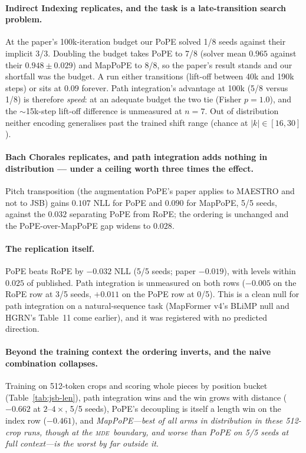 \documentclass[10pt]{article}
\newcommand{\mde}{\textsc{mde}}
\begin{document}
\paragraph{Indirect Indexing replicates, and the task is a late-transition search problem.} At the paper's
100k-iteration budget our PoPE solved 1/8 seeds against their implicit 3/3. Doubling the budget takes PoPE to
7/8 (solver mean $0.965$ against their $0.948\pm0.029$) and MapPoPE to 8/8, so the paper's result stands and
our shortfall was the budget. A run either transitions (lift-off between 40k and 190k steps) or sits at
$0.09$ forever. Path integration's advantage at 100k (5/8 versus 1/8) is therefore \emph{speed}: at an
adequate budget the two tie (Fisher $p=1.0$), and the $\sim$15k-step lift-off difference is unmeasured at
$n=7$. Out of distribution neither encoding generalises past the trained shift range (chance at
$|k|\in[16,30]$). %

\paragraph{Bach Chorales replicates, and path integration adds nothing in distribution --- under a
ceiling worth three times the effect.} Pitch transposition (the augmentation PoPE's paper applies to
MAESTRO and not to JSB) gains $0.107$ NLL for PoPE and $0.090$ for MapPoPE, 5/5 seeds, against the
$0.032$ separating PoPE from RoPE; the ordering is unchanged and the PoPE-over-MapPoPE gap widens to
$0.028$. %

\paragraph{The replication itself.} PoPE beats RoPE by
$-0.032$ NLL (5/5 seeds; paper $-0.019$), with levels within $0.025$ of published. Path integration is
unmeasured on both rows ($-0.005$ on the RoPE row at 3/5 seeds, $+0.011$ on the PoPE row at 0/5). This is a
clean null for path integration on a natural-sequence task (MapFormer v4's BLiMP null and HGRN's Table~11
come earlier), and it was registered with no predicted direction. %

\paragraph{Beyond the training context the ordering inverts, and the naive combination collapses.}
Training on 512-token crops and scoring whole pieces by position bucket (Table~\ref{tab:jsb-len}), path
integration wins and the win grows with distance ($-0.662$ at $2$--$4\times$, 5/5 seeds), PoPE's decoupling is
itself a length win on the index row ($-0.461$), and \emph{MapPoPE---best of all arms in distribution in these 512-crop runs, though at the \mde\ boundary, and worse than PoPE on 5/5 seeds at full context---is the worst by far outside it}.
\end{document}
